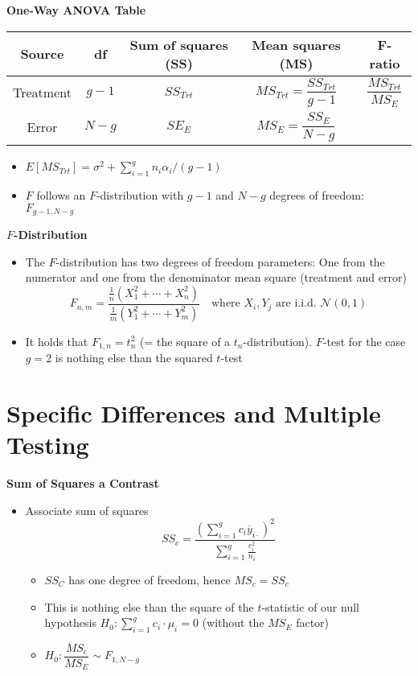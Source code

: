 \documentclass[a4paper]{article}
\begin{document}
\textbf{One-Way ANOVA Table}
\begin{table}[!htbp]
    \centering
    \begin{tabular}{c|c|c|c|c}
    \textbf{Source} & \textbf{df} & \textbf{Sum of squares (SS)} & \textbf{Mean squares (MS)} & \textbf{F-ratio} \\
    \hline
    Treatment & $g-1$ & $SS_{Trt}$ & $MS_{Trt}=\dfrac{SS_{Trt}}{g-1}$ & $\dfrac{MS_{Trt}}{MS_E}$ \\
    \hline 
    Error & $N-g$ & $SE_E$ & $MS_E=\dfrac{SS_E}{N-g}$ \\
    \end{tabular}
\end{table}
\begin{itemize}
    \item $E[MS_{Trt}]=\sigma^2+\sum_{i=1}^g n_i \alpha_i/(g-1)$
    \item $F$ follows an $F$-distribution with $g-1$ and $N-g$ degrees of freedom: $F_{g-1,N-g}$
\end{itemize}

\textbf{$F$-Distribution}
\begin{itemize}
    \item The $F$-distribution has two degrees of freedom parameters: One from the numerator and one from the denominator mean square (treatment and error)
    \[F_{n,m}=\frac{\frac{1}{n}(X_1^2+\cdots+X_n^2)}{\frac{1}{m}(Y_1^2+\cdots+Y_m^2)}\quad\textrm{where $X_i, Y_j$ are i.i.d. $\mathcal{N}(0,1)$}  \]
    \item It holds that $F_{1,n}=t_n^2$ (= the square of a $t_n$-distribution). $F$-test for the case $g=2$ is nothing else than the squared $t$-test
\end{itemize}


\section{Specific Differences and Multiple Testing}

\textbf{Sum of Squares a Contrast}
\begin{itemize}
    \item Associate sum of squares
    \[SS_c=\frac{(\sum_{i=1}^gc_i\overline{y}_{i\cdot})^2}{\sum_{i=1}^g\frac{c_i^2}{n_i}} \]
    \begin{itemize}
        \item $SS_C$ has one degree of freedom, hence $MS_c=SS_c$
        \item This is nothing else than the square of the $t$-statistic of our null hypothesis $H_0: \sum_{i=1}^gc_i\cdot\mu_i=0$ (without the $MS_E$ factor)
        \item $H_0: \dfrac{MS_c}{MS_E}\sim F_{1,N-g}$
    \end{itemize}
\end{itemize}
\end{document}
